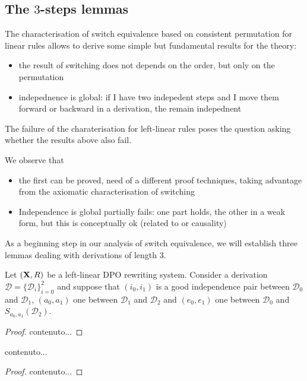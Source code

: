 \documentclass[a4paper,UKenglish,cleveref,pdftex, thm-restate,numberwithinsect]{lipics}
\def\R{\mathsf{R}}
\def\X{\textbf {\textup{X}}}
\newcommand{\dder}[1]{\mathscr{#1}}
\newcommand{\der}[1]{\underline{\dder{#1}}}
\begin{document}
\subsection{The $3$-steps lemmas} 

The characterisation of switch equivalence based on consistent permutation for linear rules allows to derive some simple but fundamental results for the theory:
\begin{itemize}
\item the result of switching does not depends on the order, but only on the permutation
\item indepednence is global: if I have two indepedent steps and I move them forward or backward in a derivation, the remain indepednent
\end{itemize}

The failure of the charaterisation for left-linear rules poses the question asking whether the results above also fail.

We observe that
\begin{itemize}
  
\item the first can be proved, need of a different proof techniques, taking advantage from the axiomatic characterisation of switching
  
\item Independence is global partially fails: one part holds, the other in a weak form, but this is conceptually ok (related to or causality)
\end{itemize}

As a beginning step in our analysis of switch equivalence, we will establish three lemmas  dealing with derivations of length $3$. 


\begin{lemma}\label{lem:primo}
	Let $(\X,\R)$ be a left-linear DPO rewriting system. Consider a derivation $\der{D}=\{\dder{D}_i\}_{i=0}^2$ and suppose that $(i_0,i_1)$ is a good independence pair between $\dder{D}_0$ and $\dder{D}_1$, $(a_0,a_1)$ one between $\dder{D}_1$ and $\dder{D}_2$ and $(e_0, e_1)$ one between $\dder{D}_0$ and $S_{a_0,a_1}(\dder{D}_2)$.
\end{lemma}
\begin{proof}
	contenuto...
\end{proof}


\begin{lemma}\label{lem:secondo}
	contenuto...
\end{lemma}
\begin{proof}
	contenuto...
\end{proof}
\end{document}

